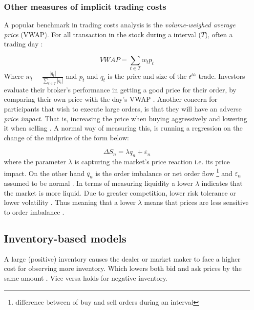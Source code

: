 \documentclass{kththesis}
\theoremstyle{definition}
\begin{document}
\subsubsection*{Other measures of implicit trading costs}
A popular benchmark in trading costs analysis is the \textit{volume-weighed average price} (VWAP). For all transaction in the stock during a interval ($T$), often a trading day \parencite{foucault2013market}:

\begin{equation}
    \label{eq:5}
    VWAP = \sum_{t\in T}{w_t p_t}
\end{equation}
Where $w_t = \frac{|q_t|}{\sum_{t\in T}{|q_t|}}$ and $p_t$ and $q_t$ is the price and size of the $t^{th}$ trade. Investors evaluate their broker's performance in getting a good price for their order, by comparing their own price with the day's VWAP \parencite{foucault2013market}. Another concern for participants that wish to execute large orders, is that they will have an adverse \textit{price impact}. That is, increasing the price when buying aggressively and lowering it when selling \parencite{cartea2015algorithmic}. A normal way of measuring this, is running a regression on the change of the midprice of the form below:

\begin{equation}
    \label{eq:6}
    \Delta S_n = \lambda q_n + \varepsilon_n
\end{equation}
where the parameter $\lambda$ is capturing the market's price reaction i.e. its price impact. On the other hand $q_n$ is the order imbalance or net order flow \footnote{difference between of buy and sell orders during an interval} and  $\varepsilon_n$ assumed to be normal \parencite{cartea2015algorithmic, foucault2013market}. In terms of measuring liquidity a lower $\lambda$ indicates that the market is more liquid. Due to greater competition, lower risk tolerance or lower volatility \parencite{cartea2015algorithmic}. Thus meaning that a lower $\lambda$ means that prices are less sensitive to order imbalance \parencite{foucault2013market}.    

\subsection{Inventory-based models}
A large (positive) inventory causes the dealer or market maker to face a higher cost for observing more inventory. Which lowers both bid and ask prices by the same amount \parencite{o1995market}. Vice versa holds for negative inventory. 
\end{document}
